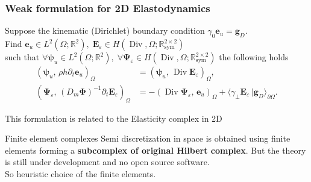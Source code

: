 \documentclass[aspectratio=169]{beamer}
\DeclareMathOperator*{\Div}{Div}
\DeclareMathOperator*{\curl}{curl}
\newcommand{\bbR}{\mathbb{R}}
\newcommand{\bbS}{\mathbb{S}}
\newcommand{\inpr}[3][]{\ensuremath{( #2, \, #3 )_{#1}}}
\newcommand{\dualpr}[3][]{\ensuremath{\langle #2 \, \vert #3 \rangle_{#1}}}
\begin{document}
\begin{frame}[fragile]\frametitle{Weak formulation for 2D Elastodynamics}
		
	\begin{tcolorbox}[nobeforeafter, colframe=theme,title=$\Div$ formulation]%
		Suppose the kinematic (Dirichlet) boundary condition $\gamma_0 \bm{e}_u = \bm{g}_D$. \\
		Find $\bm{e}_u \in L^2(\Omega; \bbR^2), \; \bm{E}_{\varepsilon} \in H(\Div, \Omega; \bbR^{2\times 2}_{\text{sym}})$ \\
		such that $\forall \bm{\psi}_u \in L^2(\Omega; \bbR^2), \; \forall \bm{\Psi}_\varepsilon \in H(\Div, \Omega; \bbR^{2\times 2}_{\text{sym}})$ the following holds
		\begin{equation*}
			\begin{aligned}
				\inpr[\Omega]{\bm{\psi}_u}{\rho h \partial_t \bm{e}_u} &= \inpr[\Omega]{\bm{\psi}_u}{\Div\bm{E}_{\varepsilon}}, \\
				\inpr[\Omega]{\bm{\Psi}_\varepsilon}{(D_m \bm{\Phi})^{-1} \partial_t \bm{E}_{\varepsilon}} &= -\inpr[\Omega]{\Div \bm{\Psi}_\varepsilon}{ \bm{e}_u} + \dualpr[\partial\Omega]{\gamma_\perp \bm{E}_\varepsilon}{\bm{g}_D}.
			\end{aligned} 
		\end{equation*}
	\vspace{.5cm}
	
	This formulation is related to the Elasticity complex in 2D 
	\begin{figure}[h]
		\centering
	\end{figure}
	\end{tcolorbox} 

\end{frame}


\begin{frame}{Finite element complexes}
Semi discretization in space is obtained using finite elements forming a \textbf{subcomplex of original Hilbert complex}. But the theory is still under development and no open source software. \\
\vspace{1cm}
So heuristic choice of the finite elements.
\end{frame}
\end{document}
